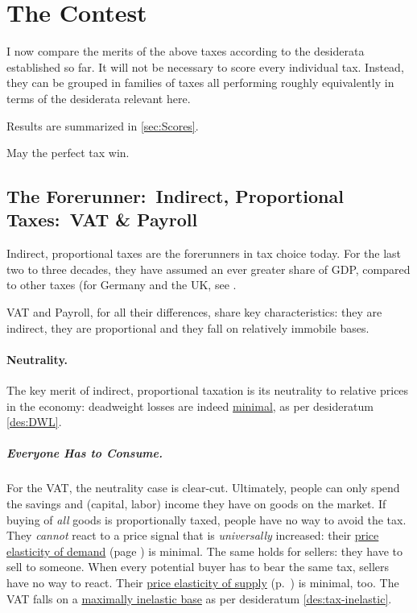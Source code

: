 \section{The Contest}
	\label{sec:contest}
I now compare the merits of the above taxes according to the desiderata established so far.
It will not be necessary to score every individual tax.
Instead, they can be grouped in families of taxes all performing roughly equivalently in terms of the desiderata relevant here.

Results are summarized in \autoref{sec:Scores}.

May the perfect tax win.

\subsection[Indirect, Proportional Taxes]{The Forerunner:\ Indirect, Proportional Taxes:\ VAT \& Payroll}
	\label{sec:ScoreVAT}
Indirect, proportional taxes are the forerunners in tax choice today.
For the last two to three decades, they have assumed an ever greater share of GDP, compared to other taxes (for Germany and the UK, see \citep[11]{Kemmerling2009}.

VAT and Payroll, for all their differences, share key characteristics:
they are indirect, they are proportional and they fall on relatively immobile bases.

\paragraph{Neutrality.}
The key merit of indirect, proportional taxation is its neutrality to relative prices in the economy:
deadweight losses are indeed \hyperref[des:DWL]{minimal}, as per desideratum \ref{des:DWL}.

\subparagraph{Everyone Has to Consume.}
For the VAT, the neutrality case is clear-cut.
Ultimately, people can only spend the savings and (capital, labor) income they have on goods on the market.
If buying of \emph{all} goods is proportionally taxed, people have no way to avoid the tax.
They \emph{cannot} react to a price signal that is \emph{universally} increased:
their \hyperref[eq:PED]{price elasticity of demand} (page \pageref{eq:PED}) is minimal.
The same holds for sellers:
they have to sell to someone.
When every potential buyer has to bear the same tax, sellers have no way to react.
Their \hyperref[eq:PES]{price elasticity of supply} (p.~\pageref{eq:PES}) is minimal, too.
The VAT falls on a \hyperref[des:tax-inelastic]{maximally inelastic base} as per desideratum \ref{des:tax-inelastic}.

